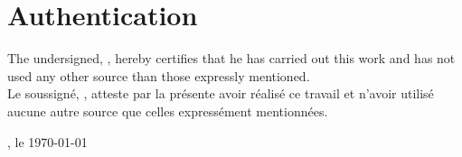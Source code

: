 \hspace{0pt}
\vfill
\section{Authentication}
The undersigned, \TBauthor, hereby certifies that he has carried out this work and has not used any other source than those expressly mentioned.
\\

Le soussigné, \TBauthor, atteste par la présente avoir réalisé  ce travail et n’avoir utilisé aucune autre source que celles expressément mentionnées.

\vspace{2cm}

, le \today

\vspace{3cm}

\begin{flushright}
    \begin{minipage}{7cm}
        {\TBauthor}
    \end{minipage}\hfill
\end{flushright}
\vfill
\hspace{0pt}
